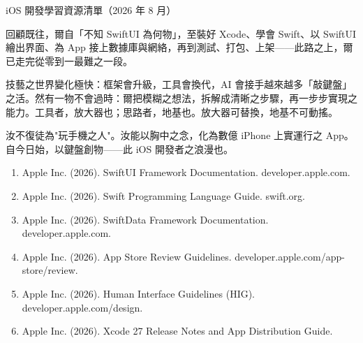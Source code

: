 \begin{center}\small\color{gray}iOS 開發學習資源清單（2026 年 8 月）\end{center}


回顧既往，爾自「不知 SwiftUI 為何物」，至裝好 Xcode、學會 Swift、以 SwiftUI 繪出界面、為 App 接上數據庫與網絡，再到測試、打包、上架——此路之上，爾已走完從零到一最難之一段。

技藝之世界變化極快：框架會升級，工具會換代，AI 會接手越來越多「敲鍵盤」之活。然有一物不會過時：爾把模糊之想法，拆解成清晰之步驟，再一步步實現之能力。工具者，放大器也；思路者，地基也。放大器可替換，地基不可動搖。

汝不復徒為"玩手機之人"。汝能以胸中之念，化為數億 iPhone 上實運行之 App。自今日始，以鍵盤創物——此 iOS 開發者之浪漫也。


\begin{enumerate}
  \item Apple Inc. (2026). SwiftUI Framework Documentation. developer.apple.com.
  \item Apple Inc. (2026). Swift Programming Language Guide. swift.org.
  \item Apple Inc. (2026). SwiftData Framework Documentation. developer.apple.com.
  \item Apple Inc. (2026). App Store Review Guidelines. developer.apple.com/app-store/review.
  \item Apple Inc. (2026). Human Interface Guidelines (HIG). developer.apple.com/design.
  \item Apple Inc. (2026). Xcode 27 Release Notes and App Distribution Guide.
\end{enumerate}
